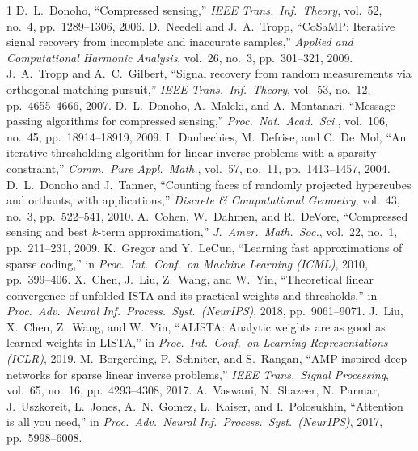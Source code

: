 \documentclass[conference,10pt]{IEEEtran}
\begin{document}
\vspace{-6pt}
{\footnotesize
\begin{thebibliography}{1}
\setlength{\itemsep}{-3pt}\setlength{\parsep}{0pt}
 D.~L.~Donoho, ``Compressed sensing,''
  \emph{IEEE Trans.\ Inf.\ Theory}, vol.~52, no.~4, pp.~1289--1306,
  2006.
 D.~Needell and J.~A.~Tropp, ``CoSaMP: Iterative
  signal recovery from incomplete and inaccurate samples,''
  \emph{Applied and Computational Harmonic Analysis}, vol.~26, no.~3,
  pp.~301--321, 2009.
 J.~A.~Tropp and A.~C.~Gilbert, ``Signal recovery from
  random measurements via orthogonal matching pursuit,'' \emph{IEEE
  Trans.\ Inf.\ Theory}, vol.~53, no.~12, pp.~4655--4666, 2007.
 D.~L.~Donoho, A.~Maleki, and A.~Montanari,
  ``Message-passing algorithms for compressed sensing,'' \emph{Proc.\
  Nat.\ Acad.\ Sci.}, vol.~106, no.~45, pp.~18914--18919, 2009.
 I.~Daubechies, M.~Defrise, and C.~De~Mol, ``An iterative
  thresholding algorithm for linear inverse problems with a sparsity
  constraint,'' \emph{Comm.\ Pure Appl.\ Math.}, vol.~57, no.~11,
  pp.~1413--1457, 2004.
 D.~L.~Donoho and J.~Tanner, ``Counting faces of
  randomly projected hypercubes and orthants, with applications,''
  \emph{Discrete \& Computational Geometry}, vol.~43, no.~3,
  pp.~522--541, 2010.
 A.~Cohen, W.~Dahmen, and R.~DeVore,
  ``Compressed sensing and best $k$-term approximation,'' \emph{J.\
  Amer.\ Math.\ Soc.}, vol.~22, no.~1, pp.~211--231, 2009.
\bibitem{lista} K.~Gregor and Y.~LeCun, ``Learning fast approximations
  of sparse coding,'' in \emph{Proc.\ Int.\ Conf.\ on Machine Learning
  (ICML)}, 2010, pp.~399--406.
\bibitem{cpss} X.~Chen, J.~Liu, Z.~Wang, and W.~Yin, ``Theoretical
  linear convergence of unfolded ISTA and its practical weights and
  thresholds,'' in \emph{Proc.\ Adv.\ Neural Inf.\ Process.\ Syst.\
  (NeurIPS)}, 2018, pp.~9061--9071.
\bibitem{alista} J.~Liu, X.~Chen, Z.~Wang, and W.~Yin, ``ALISTA:
  Analytic weights are as good as learned weights in LISTA,'' in
  \emph{Proc.\ Int.\ Conf.\ on Learning Representations (ICLR)}, 2019.
\bibitem{lamp} M.~Borgerding, P.~Schniter, and S.~Rangan,
  ``AMP-inspired deep networks for sparse linear inverse problems,''
  \emph{IEEE Trans.\ Signal Processing}, vol.~65, no.~16,
  pp.~4293--4308, 2017.
\bibitem{vaswani-transformer} A.~Vaswani, N.~Shazeer, N.~Parmar,
  J.~Uszkoreit, L.~Jones, A.~N.~Gomez, L.~Kaiser, and I.~Polosukhin,
  ``Attention is all you need,'' in \emph{Proc.\ Adv.\ Neural Inf.\
  Process.\ Syst.\ (NeurIPS)}, 2017, pp.~5998--6008.
\end{thebibliography}
}
\end{document}
